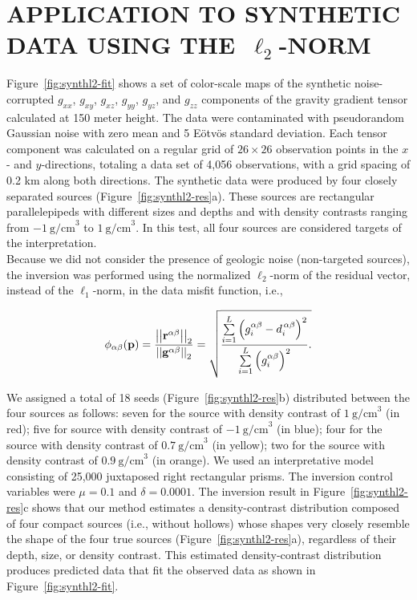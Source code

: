 \documentclass[twocolumn]{article}
\newcommand{\vect}[1]{\mathbf{#1}}
\newcommand{\norm}[1]{\left|\left|#1\right|\right|}
\begin{document}
\vspace{-0.7cm}
\section*{\normalsize\center APPLICATION TO SYNTHETIC DATA USING THE~$\ell_{2}$-NORM}

Figure~\ref{fig:synthl2-fit} shows
a set of color-scale maps of the synthetic noise-corrupted
$g_{xx}$, $g_{xy}$, $g_{xz}$, $g_{yy}$, $g_{yz}$, and $g_{zz}$ components
of the gravity gradient tensor
calculated at 150 meter height.
The data were contaminated with pseudorandom Gaussian noise
with zero mean and 5 E\"otv\"os standard deviation.
Each tensor component was calculated on a regular grid
of $26\times 26$ observation points in the $x$- and $y$-directions,
totaling a data set of 4,056 observations,
with a grid spacing of 0.2 km along both directions.
The synthetic data were produced by four closely separated sources
(Figure~\ref{fig:synthl2-res}a).
These sources are rectangular parallelepipeds
with different sizes and depths and with density contrasts
ranging from $-1\ \mathrm{g/cm}^{3}$ to $1\ \mathrm{g/cm}^{3}$.
In this test, all four sources are considered targets of the interpretation.
\\
\indent
Because we did not consider the presence of geologic noise
(non-targeted sources),
the inversion was performed using
the normalized $\ell_{2}$-norm of the residual vector,
instead of the $\ell_{1}$-norm,
in the data misfit function, i.e.,

\begin{equation}
\phi_{\alpha\beta}(\vect{p}) =
\dfrac{\norm{\vect{r}^{\alpha\beta}}_2}{\norm{\vect{g}^{\alpha\beta}}_2} =
\sqrt{
    \dfrac{\sum\limits_{i=1}^{L}\left(g_i^{\alpha\beta} -
        d_i^{\thinspace\alpha\beta}\right)^{2}}
    {\sum\limits_{i=1}^{L}\left(g_i^{\alpha\beta}\right)^{2}}.}
\end{equation}


We assigned a total of 18 seeds (Figure~\ref{fig:synthl2-res}b)
distributed between the four sources as follows:
seven for the source with density contrast of $1\ \mathrm{g/cm}^{3}$ (in red);
five for source with density contrast of $-1\ \mathrm{g/cm}^{3}$ (in blue);
four for the source with density contrast of $0.7\ \mathrm{g/cm}^{3}$ (in yellow);
two for the source with density contrast of $0.9\ \mathrm{g/cm}^{3}$ (in orange).
We used an interpretative model
consisting of 25,000 juxtaposed right rectangular prisms.
The inversion control variables were
$\mu = 0.1$ and $\delta = 0.0001$.
The inversion result in Figure~\ref{fig:synthl2-res}c
shows that our method estimates a density-contrast distribution
composed of four compact sources
(i.e., without hollows)
whose shapes very closely resemble
the shape of the four true sources (Figure~\ref{fig:synthl2-res}a),
regardless of their depth, size, or density contrast.
This estimated density-contrast distribution
produces predicted data that fit the observed data
as shown in Figure~\ref{fig:synthl2-fit}.
\end{document}
